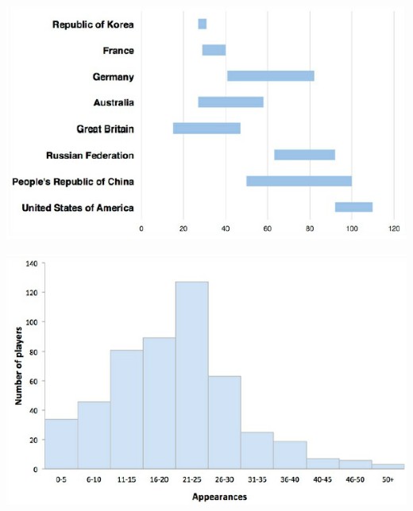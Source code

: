 \begin{itemize}
\begin{center}
        \includegraphics[scale=0.45]{images/marco_teorico/barra_flotante_chart.png}
        \label{fig:marco_teorico_barra_flotante_chart}
        \bigbreak
        
        \includegraphics[scale=0.45]{images/marco_teorico/histograma_chart.png}
        \label{fig:marco_teorico_histograma_chart}
        \bigbreak
    \end{center}
    

\end{itemize}
